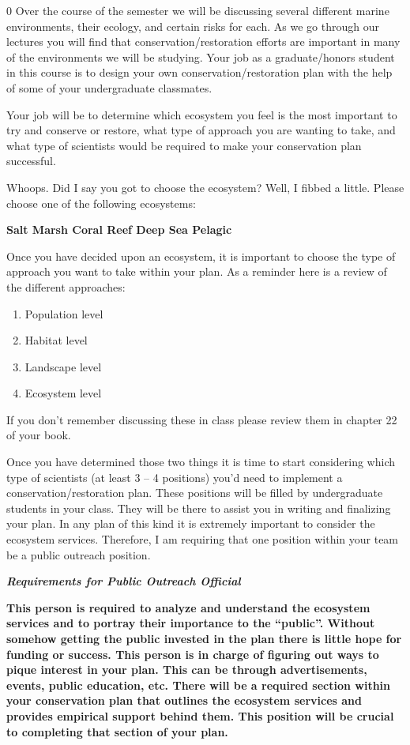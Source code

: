 0 Over the course of the semester we will be discussing several
different marine environments, their ecology, and certain risks for
each. As we go through our lectures you will find that
conservation/restoration efforts are important in many of the
environments we will be studying. Your job as a graduate/honors student
in this course is to design your own conservation/restoration plan with
the help of some of your undergraduate classmates.

Your job will be to determine which ecosystem you feel is the most
important to try and conserve or restore, what type of approach you are
wanting to take, and what type of scientists would be required to make
your conservation plan successful.

Whoops. Did I say you got to choose the ecosystem? Well, I fibbed a
little. Please choose one of the following ecosystems:

\textbf{Salt Marsh Coral Reef Deep Sea Pelagic }

Once you have decided upon an ecosystem, it is important to choose the
type of approach you want to take within your plan. As a reminder here
is a review of the different approaches:

\begin{enumerate}
\def\labelenumi{\arabic{enumi}.}
\item
  Population level
\item
  Habitat level
\item
  Landscape level
\item
  Ecosystem level
\end{enumerate}

If you don't remember discussing these in class please review them in
chapter 22 of your book.

Once you have determined those two things it is time to start
considering which type of scientists (at least 3 -- 4 positions) you'd
need to implement a conservation/restoration plan. These positions will
be filled by undergraduate students in your class. They will be there to
assist you in writing and finalizing your plan. In any plan of this kind
it is extremely important to consider the ecosystem services. Therefore,
I am requiring that one position within your team be a public outreach
position.

\textbf{\emph{Requirements for Public Outreach Official}}

\textbf{This person is required to analyze and understand the ecosystem
services and to portray their importance to the ``public''. Without
somehow getting the public invested in the plan there is little hope for
funding or success. This person is in charge of figuring out ways to
pique interest in your plan. This can be through advertisements, events,
public education, etc. There will be a required section within your
conservation plan that outlines the ecosystem services and provides
empirical support behind them. This position will be crucial to
completing that section of your plan.}

